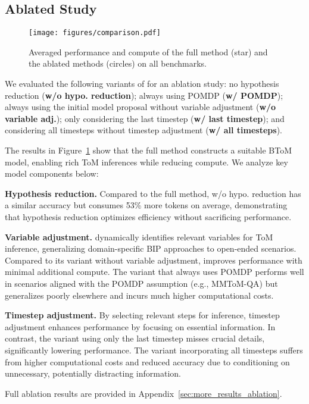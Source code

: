 \subsection{Ablated Study}



\begin{figure}[t!]
  \centering
  \texttt{[image: figures/comparison.pdf]}
    \vspace{-10pt}
  \caption{Averaged performance and compute of the full \ours method (star) and the ablated methods (circles) on all benchmarks.}
  \label{fig:ablation}
  \vspace{-10pt}
\end{figure}


We evaluated the following variants of \ours for an ablation study: no hypothesis reduction (\textbf{w/o hypo. reduction}); always using POMDP (\textbf{w/ POMDP}); always using the initial model proposal without variable adjustment (\textbf{w/o variable adj.}); only considering the last timestep (\textbf{w/ last timestep}); and considering all timesteps without timestep adjustment (\textbf{w/ all timesteps}).

The results in Figure~\ref{fig:ablation} show that the full \ours method constructs a suitable BToM model, enabling rich ToM inferences while reducing compute. We analyze key model components below:

\textbf{Hypothesis reduction.}
Compared to the full method, \ours w/o hypo. reduction has a similar accuracy but consumes 53\% more tokens on average, demonstrating that hypothesis reduction optimizes efficiency without sacrificing performance.

\textbf{Variable adjustment.}
\ours dynamically identifies relevant variables for ToM inference, generalizing domain-specific BIP approaches to open-ended scenarios. Compared to its variant without variable adjustment, \ours improves performance with minimal additional compute. The variant that always uses POMDP performs well in scenarios aligned with the POMDP assumption (e.g., MMToM-QA) but generalizes poorly elsewhere and incurs much higher computational costs. %

\textbf{Timestep adjustment.}
By selecting relevant steps for inference, timestep adjustment enhances performance by focusing on essential information. In contrast, the variant using only the last timestep misses crucial details, significantly lowering performance. The variant incorporating all timesteps suffers from higher computational costs and reduced accuracy due to conditioning on unnecessary, potentially distracting information.



Full ablation results are provided in Appendix~\ref{sec:more_results_ablation}.

